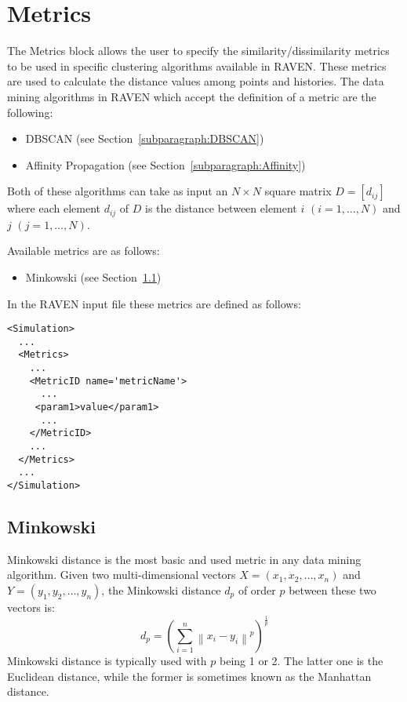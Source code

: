 \section{Metrics}
\label{sec:Metrics}

The Metrics block allows the user to specify the similarity/dissimilarity metrics to be used in specific clustering algorithms available in RAVEN.
These metrics are used to calculate the distance values among points and histories.
The data mining algorithms in RAVEN which accept the definition of a metric are the following:
\begin{itemize}
  \item DBSCAN (see Section~\ref{subparagraph:DBSCAN})
  \item Affinity Propagation (see Section~\ref{subparagraph:Affinity})
\end{itemize}
Both of these algorithms can take as input an $N \times N$ square matrix $D=[d_{ij}]$ where each element $d_{ij}$ of $D$ is the distance between element $i$ $(i=1,\ldots,N)$ and $j$
$(j=1,\ldots,N)$.

Available metrics are as follows:
\begin{itemize}
  \item Minkowski (see Section~\ref{subsection:Minkowski})
\end{itemize}

In the RAVEN input file these metrics are defined as follows:
\begin{lstlisting}[style=XML]
<Simulation>
  ...
  <Metrics>
    ...
    <MetricID name='metricName'>
      ...
     <param1>value</param1>
      ...
    </MetricID>
    ...
  </Metrics>
  ...
</Simulation>
\end{lstlisting}

\subsection{Minkowski}
\label{subsection:Minkowski}
Minkowski distance is the most basic and used metric in any data mining algorithm.
Given two multi-dimensional vectors $X=(x_1,x_2,\ldots,x_n)$ and $Y=(y_1,y_2,\ldots,y_n)$, the Minkowski distance $d_p$ of order $p$ between these two vectors is:
\begin{equation}
d_p = \left ( \sum_{i=1}^{n} \left \| x_i-y_i \right \|^p \right )^\frac{1}{p}
\end{equation}
Minkowski distance is typically used with $p$ being 1 or 2. The latter one is the Euclidean distance, while the former is sometimes known as the Manhattan distance. 

